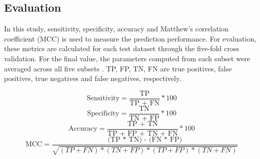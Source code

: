     \subsection{Evaluation}
        
        In this study, sensitivity, specificity, accuracy and Matthew's correlation coefficient (MCC) is used to measure the 
        prediction performance. For evaluation, these metrics are calculated for each test dataset through the five-fold cross validation.
        For the final value, the parameters computed from each subset were averaged across all five subsets . TP, FP, TN, FN are 
        true positives, false positives, true negatives and false negatives, respectively. 

        \begin{equation}
            \text{Sensitivity} = \frac {\text{TP}}{\text{TP + FN}} * 100
        \end{equation}
        \begin{equation}
            \text{Specificity} = \frac {\text{TN}}{\text{TN + FP}} * 100
        \end{equation}
        \begin{equation}
            \text{Accuracy} = \frac {\text{TP + TN}}{\text{TP + FP + TN + FN}} * 100
        \end{equation}
        \begin{equation}
            \text{MCC} = \frac {\text{(TP * TN) - (FN * FP)}}{\sqrt{(TP + FN) * (TN + FP) * (TP + FP) * (TN + FN)}}
        \end{equation}

